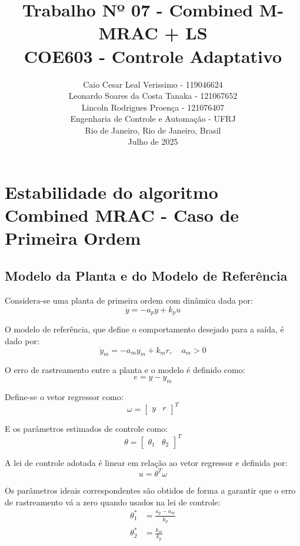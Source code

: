 \documentclass[10pt]{article}
\title{
    Trabalho Nº 07 -  Combined M-MRAC + LS \\
    \large COE603 - Controle Adaptativo
}
\author{
    Caio Cesar Leal Verissimo - 119046624 \\
    Leonardo Soares da Costa Tanaka - 121067652 \\
    Lincoln Rodrigues Proença - 121076407 \\
    Engenharia de Controle e Automação - UFRJ \\
    Rio de Janeiro, Rio de Janeiro, Brasil \\
    Julho de 2025
}
\date{}
\begin{document}
\maketitle

\newpage

\tableofcontents
\newpage

\section{Estabilidade do algoritmo Combined MRAC - Caso de Primeira Ordem}

\subsection{Modelo da Planta e do Modelo de Referência}

Considera-se uma planta de primeira ordem com dinâmica dada por:
\begin{equation}
    \dot{y} = -a_p y + k_p u
\end{equation}

O modelo de referência, que define o comportamento desejado para a saída, é dado por:
\begin{equation}
    \dot{y}_m = -a_m y_m + k_m r, \quad a_m > 0
\end{equation}

O erro de rastreamento entre a planta e o modelo é definido como:
\begin{equation}
    e = y - y_m
\end{equation}

Define-se o vetor regressor como:
\begin{equation}
    \omega = \begin{bmatrix} y & r \end{bmatrix}^T
\end{equation}

E os parâmetros estimados de controle como:
\begin{equation}
    \theta = \begin{bmatrix} \theta_1 & \theta_2 \end{bmatrix}^T
\end{equation}

A lei de controle adotada é linear em relação ao vetor regressor e definida por:
\begin{equation}
    u = \theta^T \omega
\end{equation}

Os parâmetros ideais correspondentes são obtidos de forma a garantir que o erro de rastreamento vá a zero quando usados na lei de controle:
\begin{align}
    \theta_1^* &= \frac{a_p - a_m}{k_p} \\
    \theta_2^* &= \frac{k_m}{k_p}
\end{align}
\end{document}
